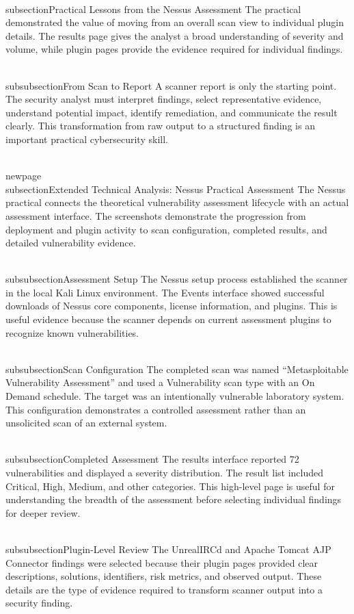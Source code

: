 \documentclass[11pt,a4paper]{article}
\begin{document}
\\subsection{Practical Lessons from the Nessus Assessment}
The practical demonstrated the value of moving from an overall scan view to individual plugin details. The results page gives the analyst a broad understanding of severity and volume, while plugin pages provide the evidence required for individual findings.

\\subsubsection{From Scan to Report}
A scanner report is only the starting point. The security analyst must interpret findings, select representative evidence, understand potential impact, identify remediation, and communicate the result clearly. This transformation from raw output to a structured finding is an important practical cybersecurity skill.

\\newpage
\\subsection{Extended Technical Analysis: Nessus Practical Assessment}
The Nessus practical connects the theoretical vulnerability assessment lifecycle with an actual assessment interface. The screenshots demonstrate the progression from deployment and plugin activity to scan configuration, completed results, and detailed vulnerability evidence.

\\subsubsection{Assessment Setup}
The Nessus setup process established the scanner in the local Kali Linux environment. The Events interface showed successful downloads of Nessus core components, license information, and plugins. This is useful evidence because the scanner depends on current assessment plugins to recognize known vulnerabilities.

\\subsubsection{Scan Configuration}
The completed scan was named ``Metasploitable Vulnerability Assessment'' and used a Vulnerability scan type with an On Demand schedule. The target was an intentionally vulnerable laboratory system. This configuration demonstrates a controlled assessment rather than an unsolicited scan of an external system.

\\subsubsection{Completed Assessment}
The results interface reported 72 vulnerabilities and displayed a severity distribution. The result list included Critical, High, Medium, and other categories. This high-level page is useful for understanding the breadth of the assessment before selecting individual findings for deeper review.

\\subsubsection{Plugin-Level Review}
The UnrealIRCd and Apache Tomcat AJP Connector findings were selected because their plugin pages provided clear descriptions, solutions, identifiers, risk metrics, and observed output. These details are the type of evidence required to transform scanner output into a security finding.
\end{document}
